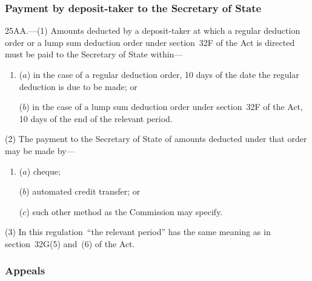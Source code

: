 \documentclass[12pt,a4paper]{article}
\begin{document}
\subsubsection[25AA. Payment by deposit-taker to the 
Secretary of State%
]{Payment by deposit-taker to the 
Secretary of State%
}

25AA.---(1)  Amounts deducted by a deposit-taker at which a regular deduction order or a lump sum deduction order under section~32F of the Act is directed must be paid to the 
Secretary of State  %
within—
\begin{enumerate}\item[]
($a$) in the case of a regular deduction order, 10 days of the date the regular deduction is due to be made; or

($b$) in the case of a lump sum deduction order under section~32F of the Act, 10 days of the end of the relevant period.
\end{enumerate}

(2) The payment to the 
Secretary of State  %
of amounts deducted under that order may be made by—
\begin{enumerate}\item[]
($a$) cheque;

($b$) automated credit transfer; or

($c$) such other method as the Commission may specify.
\end{enumerate}

(3) In this regulation~“the relevant period” has the same meaning as in section~32G(5) and~(6) of the Act.


\subsubsection[25AB. Appeals]{Appeals}
\end{document}
